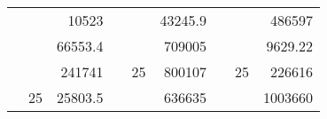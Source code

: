 \begin{table}[H]
\begin{tabular}{|ccrccrccc}
\rowcolor[HTML]{DAE8FC} 
\multicolumn{1}{|c|}{\cellcolor[HTML]{FFFFC7}}                                & \multicolumn{1}{c|}{\cellcolor[HTML]{DAE8FC}}                      & \multicolumn{1}{r|}{\cellcolor[HTML]{DAE8FC}10523}     & \multicolumn{1}{c|}{\cellcolor[HTML]{FFFFC7}}                                & \multicolumn{1}{c|}{\cellcolor[HTML]{DAE8FC}}                       & \multicolumn{1}{r|}{\cellcolor[HTML]{DAE8FC}43245.9}   & \multicolumn{1}{c|}{\cellcolor[HTML]{FFFFC7}}                                & \multicolumn{1}{c|}{\cellcolor[HTML]{DAE8FC}}                      & \multicolumn{1}{r|}{\cellcolor[HTML]{DAE8FC}486597}    \\ \cline{3-3} \cline{6-6} \cline{9-9} 
\multicolumn{1}{|c|}{\cellcolor[HTML]{FFFFC7}}                                & \multicolumn{1}{c|}{\cellcolor[HTML]{DAE8FC}}                      & \multicolumn{1}{r|}{\cellcolor[HTML]{DDFDFF}66553.4}   & \multicolumn{1}{c|}{\cellcolor[HTML]{FFFFC7}}                                & \multicolumn{1}{c|}{\cellcolor[HTML]{DAE8FC}}                       & \multicolumn{1}{r|}{\cellcolor[HTML]{DDFDFF}709005}    & \multicolumn{1}{c|}{\cellcolor[HTML]{FFFFC7}}                                & \multicolumn{1}{c|}{\cellcolor[HTML]{DAE8FC}}                      & \multicolumn{1}{r|}{\cellcolor[HTML]{DDFDFF}9629.22}   \\ \cline{3-3} \cline{6-6} \cline{9-9} 
\rowcolor[HTML]{DAE8FC} 
\multicolumn{1}{|c|}{\cellcolor[HTML]{FFFFC7}}                                & \multicolumn{1}{c|}{\cellcolor[HTML]{DAE8FC}}                      & \multicolumn{1}{r|}{\cellcolor[HTML]{DAE8FC}241741}    & \multicolumn{1}{c|}{\cellcolor[HTML]{FFFFC7}}                                & \multicolumn{1}{c|}{\multirow{-9}{*}{\cellcolor[HTML]{DAE8FC}25}}   & \multicolumn{1}{r|}{\cellcolor[HTML]{DAE8FC}800107}    & \multicolumn{1}{c|}{\cellcolor[HTML]{FFFFC7}}                                & \multicolumn{1}{c|}{\multirow{-9}{*}{\cellcolor[HTML]{DAE8FC}25}}  & \multicolumn{1}{r|}{\cellcolor[HTML]{DAE8FC}226616}    \\ \cline{3-3} \cline{5-6} \cline{8-9} 
\multicolumn{1}{|c|}{\cellcolor[HTML]{FFFFC7}}                                & \multicolumn{1}{c|}{\multirow{-10}{*}{\cellcolor[HTML]{DAE8FC}25}} & \multicolumn{1}{r|}{\cellcolor[HTML]{DDFDFF}25803.5}   & \multicolumn{1}{c|}{\cellcolor[HTML]{FFFFC7}}                                & \multicolumn{1}{c|}{\cellcolor[HTML]{DDFDFF}}                       & \multicolumn{1}{r|}{\cellcolor[HTML]{DAE8FC}636635}    & \multicolumn{1}{c|}{\cellcolor[HTML]{FFFFC7}}                                & \multicolumn{1}{c|}{\cellcolor[HTML]{DDFDFF}}                      & \multicolumn{1}{r|}{\cellcolor[HTML]{DAE8FC}1003660}   \\ \cline{2-3} \cline{6-6} \cline{9-9} 

\end{tabular}
\end{table}
